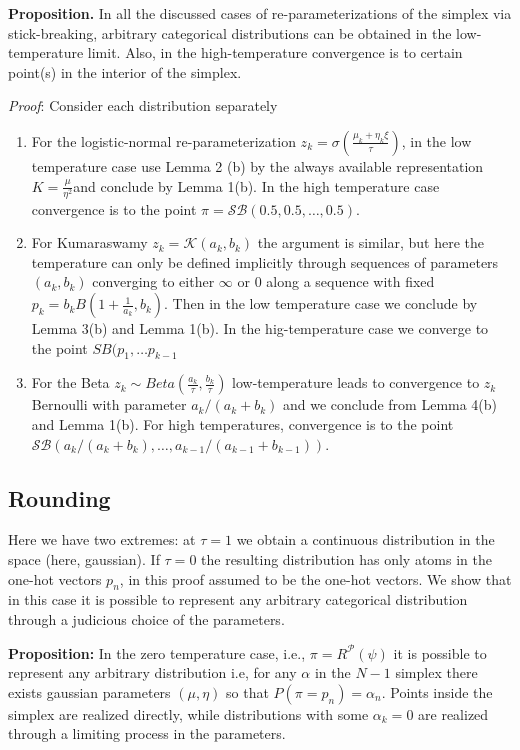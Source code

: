 \textbf{Proposition.} In all the discussed cases of re-parameterizations of the simplex via stick-breaking, arbitrary categorical distributions can be obtained in the low-temperature limit. Also, in the high-temperature convergence is to certain point(s) in the interior of the simplex.

\textit{Proof}: Consider each distribution separately
\begin{enumerate}
\item For the logistic-normal re-parameterization $z_k = \sigma\left( \frac{\mu_k+\eta_k\xi}{\tau}\right)$, in the low temperature case use Lemma 2 (b) by the always available representation  $K= \frac{\mu}{\eta^2}$and conclude by Lemma 1(b). In the high temperature case convergence is to the point $\pi = \mathcal{SB}(0.5,0.5,\ldots, 0.5)$.
\item For Kumaraswamy $z_k=\mathcal{K}(a_k,b_k)$ the argument is similar, but here the temperature can only be defined implicitly through sequences of parameters $(a_k,b_k)$ converging to either $\infty$ or 0 along a sequence with fixed $p_k=b_kB\left(1+\frac{1}{a_k},b_k\right)$. Then in the low temperature case we conclude by Lemma 3(b) and Lemma 1(b). In the hig-temperature case we converge to the point $SB(p_1,\ldots p_{k-1}$
\item For the Beta $z_k\sim Beta(\frac{a_k}{\tau},\frac{b_k}{\tau})$ low-temperature leads to convergence to $z_k$ Bernoulli with parameter $a_k/(a_k+b_k)$ and we conclude from Lemma 4(b) and Lemma 1(b). For high temperatures, convergence is to the point $\mathcal{SB}(a_k/(a_k+b_k),\ldots,a_{k-1}/(a_{k-1}+b_{k-1}))$.  \end{enumerate}


\subsection{Rounding}
Here we have two extremes: at $\tau =1$ we obtain a continuous distribution in the space (here, gaussian). If $\tau=0$ the resulting distribution has only atoms in the one-hot vectors $p_n$, in this proof assumed to be the one-hot vectors. We show that in this case it is possible to represent any arbitrary categorical distribution through a judicious choice of the parameters.


\textbf{Proposition:} In the zero temperature case, i.e., $\pi  = R^\mathcal{P}(\psi)$ it is possible to represent any arbitrary distribution i.e, for any $\alpha$ in the $N-1$ simplex there exists gaussian parameters $(\mu, \eta)$ so that   $P(\pi = p_n)  = \alpha_n$. Points inside the simplex are realized directly, while distributions with some $\alpha_k=0$ are realized through a limiting process in the parameters.

